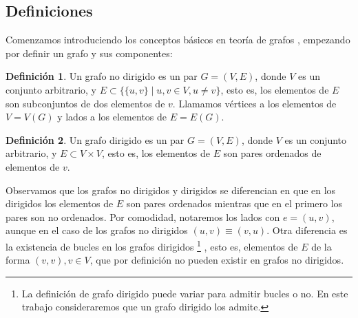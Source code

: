 \documentclass[a4paper,12pt]{report}
\theoremstyle{definition}
\newtheorem{dfn}{Definición}
\begin{document}
\subsection{Definiciones}

Comenzamos introduciendo los conceptos básicos en teoría de grafos \cite{bollobas1979graph, diestel2012graph}, empezando por definir un grafo y sus componentes:

\begin{dfn}
  Un grafo no dirigido es un par $G = (V,E)$, donde $V$ es un conjunto arbitrario, y $E \subset \lbrace \lbrace u,v \rbrace \mid u,v \in V , u \neq v \rbrace$, esto es, los elementos de $E$ son subconjuntos de dos elementos de $v$.
  Llamamos vértices a los elementos de $V = V(G)$ y lados a los elementos de $E = E(G)$.
\end{dfn}

\begin{dfn}
  Un grafo dirigido es un par $G = (V,E)$, donde $V$ es un conjunto arbitrario, y $E \subset V \times V$, esto es, los elementos de $E$ son pares ordenados de elementos de $v$.
\end{dfn}

Observamos que los grafos no dirigidos y dirigidos se diferencian en que en los dirigidos los elementos de $E$ son pares ordenados mientras que en el primero los pares son no ordenados. Por comodidad, notaremos los lados con $e = (u,v)$, aunque en el caso de los grafos no dirigidos $(u,v) \equiv (v,u)$.
Otra diferencia es la existencia de bucles en los grafos dirigidos%
\footnote{La definición de grafo dirigido puede variar para admitir bucles o no. En este trabajo consideraremos que un grafo dirigido los admite.}%
, esto es, elementos de $E$ de la forma $(v,v), v \in V$, que por definición no pueden existir en grafos no dirigidos.
\end{document}
